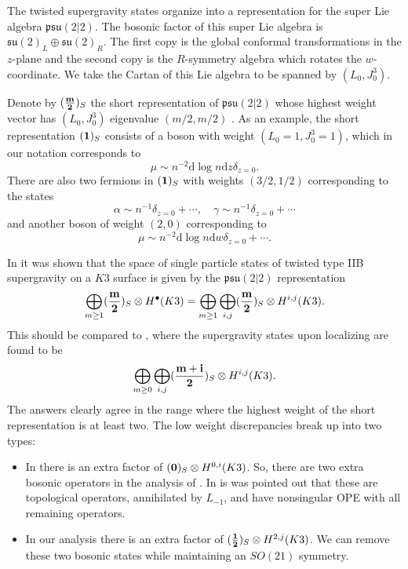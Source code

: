 \documentclass[11pt]{amsart}
\renewcommand{\d}{\mathrm{d}}
\def\bu{{\bullet}}
\def\lie#1{\ensuremath{\mathfrak{#1}}}
\def\beqn{\begin{equation}}
\def\eeqn{\end{equation}}
\theoremstyle{thm}
\numberwithin{equation}{subsection}
\theoremstyle{def}
\theoremstyle{rem}
\begin{document}
The twisted supergravity states organize into a representation for the super Lie algebra $\lie{psu}(2|2)$.
The bosonic factor of this super Lie algebra is $\lie{su}(2)_L \oplus \lie{su}(2)_R$. 
The first copy is the global conformal transformations in the $z$-plane and the second copy is the $R$-symmetry algebra which rotates the $w$-coordinate.
We take the Cartan of this Lie algebra to be spanned by $(L_0, J_0^3)$. 
  
Denote by $(\frac{\bf m}{\bf 2})_S$ the short representation of $\lie{psu}(2|2)$ whose highest weight vector has $(L_0, J_0^3)$ eigenvalue $(m/2,m/2)$ \cite{dB1}. 
As an example, the short representation $({\bf 1})_S$ consists of a boson with weight $(L_0 = 1, J_0^3 = 1)$, which in our notation corresponds to 
\beqn
\mu \sim n^{-2} \d \log n \d z \delta_{z=0}  .
\eeqn 
There are also two fermions in $({\bf 1})_S$ with weights $(3/2,1/2)$ corresponding to the states
\beqn
\alpha \sim n^{-1} \delta_{z=0} + \cdots , \quad \gamma \sim n^{-1}\delta_{z=0} + \cdots
\eeqn
and another boson of weight $(2,0)$ corresponding to 
\beqn
\mu \sim n^{-2} \d \log n \d w \delta_{z=0} + \cdots .
\eeqn 

In \cite{CP} it was shown that the space of single particle states of twisted type IIB supergravity on a $K3$ surface is given by the $\lie{psu}(2|2)$ representation 
\beqn\label{eqn:IIBstates}
\bigoplus_{m \geq 1} (\frac{\bf m}{\bf 2})_S \otimes H^\bu(K3) = \bigoplus_{m \geq 1} \bigoplus_{i,j} (\frac{\bf m}{\bf 2})_S \otimes H^{i,j} (K3)  . 
\eeqn 
This should be compared to \cite{dB1}, where the supergravity states upon localizing are found to be
\beqn\label{eqn:db1}
\bigoplus_{m \geq 0} \bigoplus_{i,j} (\frac{\bf m+i}{\bf 2})_S \otimes H^{i,j} (K3) .
\eeqn
The answers clearly agree in the range where the highest weight of the short representation is at least two. 
The low weight discrepancies break up into two types:
\begin{itemize}
\item In \cite{dB1} there is an extra factor of $({\bf 0})_S \otimes H^{0,i}(K3)$. 
So, there are two extra bosonic operators in the analysis of \cite{dB1}. 
In \cite{CP} is was pointed out that these are topological operators, annihilated by $L_{-1}$, and have nonsingular OPE with all remaining operators. 
\item 
In our analysis there is an extra factor of $(\frac{\bf 1}{\bf 2})_S \otimes H^{2,j}(K3)$. 
We can remove these two bosonic states while maintaining an $SO(21)$ symmetry. 
\end{itemize}
\end{document}
